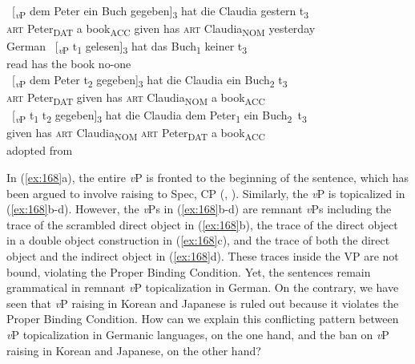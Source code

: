 \ea\label{ex:168}
\ea\gll ~[\textit{\textsubscript{v}}\textsubscript{P} dem Peter      ein Buch      gegeben]\textsubscript{3} hat die  Claudia    gestern     t\textsubscript{3} \\
 {} \textsc{art}  Peter\textsubscript{DAT} a    book\textsubscript{ACC} given       has \textsc{art} Claudia\textsubscript{NOM} yesterday \\\hfill German
\ex \gll  ~[\textit{\textsubscript{v}}\textsubscript{P} t\textsubscript{1} gelesen]\textsubscript{3} hat das Buch\textsubscript{1} keiner t\textsubscript{3} \\
{} {} read  has the book  no-one \\
\ex \gll ~[\textit{\textsubscript{v}}\textsubscript{P} dem Peter       t\textsubscript{2} gegeben]\textsubscript{3} hat die  Claudia       ein Buch\textsubscript{2} t\textsubscript{3}  \\
{} \textsc{art}  Peter\textsubscript{DAT} {}    given  has \textsc{art} Claudia\textsubscript{NOM} a    book\textsubscript{ACC} \\
\ex \gll ~[\textit{\textsubscript{v}}\textsubscript{P} t\textsubscript{1} t\textsubscript{2} gegeben]\textsubscript{3} hat die  Claudia     dem Peter\textsubscript{1}     ein Buch\textsubscript{2}~t\textsubscript{3}   \\
{} {} {} given  has \textsc{art} Claudia\textsubscript{NOM} \textsc{art}  Peter\textsubscript{DAT} a    book\textsubscript{ACC} \\
adopted from \citet[187, (5)]{Muller1998}
\z\z

In (\ref{ex:168}a), the entire \textit{v}P is fronted to the beginning of the sentence, which has been argued to involve raising to Spec, \ac{CP} (\citealt{BestenWebelhuth1987}, \citealt{Thiersch1985}). Similarly, the \textit{v}P is topicalized in (\ref{ex:168}b-d). However, the \textit{v}Ps in (\ref{ex:168}b-d) are remnant \textit{v}Ps including the trace of the scrambled direct object in (\ref{ex:168}b), the trace of the direct object in a double object construction in (\ref{ex:168}c), and the trace of both the direct object and the indirect object in (\ref{ex:168}d). These traces inside the \ac{VP} are not bound, violating the Proper Binding Condition. Yet, the sentences remain grammatical in remnant \textit{v}P topicalization in German. On the contrary, we have seen that \textit{v}P raising in Korean and Japanese is ruled out because it violates the Proper Binding Condition. How can we explain this conflicting pattern between \textit{v}P topicalization in Germanic languages, on the one hand, and the ban on \textit{v}P raising in Korean and Japanese, on the other hand?


